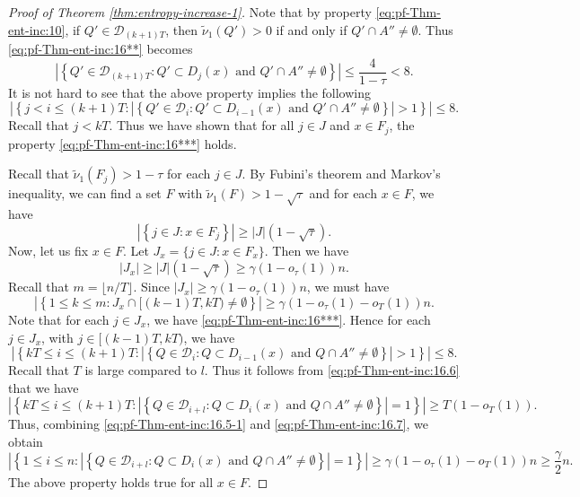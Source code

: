 \documentclass[a4paper,11pt]{amsart}
\theoremstyle{definition}
\numberwithin{equation}{section}
\def\D{\mathcal{D}}
\begin{document}
\begin{proof}[Proof of Theorem \ref{thm:entropy-increase-1}]
{Note that by property \eqref{eq:pf-Thm-ent-inc:10}, if $Q'\in \D_{(k+1)T}$, then $\tilde{\nu}_1(Q')>0$ if and only if $Q'\cap A''\neq \emptyset.$ Thus \eqref{eq:pf-Thm-ent-inc:16**} becomes 
\begin{equation}\label{eq:pf-Thm-ent-inc:16**.1}
\left| \left\{ Q'\in \D_{(k+1)T}: Q'\subset  D_j(x) \textrm{  and  }  Q'\cap A''\neq \emptyset  \right\} \right| \le \frac{4}{1-\tau}<8.
\end{equation}
It is not hard to see that the above property implies the following 
\begin{equation}\label{eq:pf-Thm-ent-inc:16***}
\left|\left\{j< i\le (k+1)T: \left| \left\{ Q'\in \D_{i}: Q'\subset  D_{i-1}(x) \textrm{  and  }  Q'\cap A''\neq \emptyset  \right\} \right|>1\right\}\right| \le 8.
\end{equation}
Recall that $j<kT$.   Thus we have shown that for all $j\in J$ and $x\in F_j$, the property \eqref{eq:pf-Thm-ent-inc:16***} holds.

Recall that $\tilde{\nu}_1(F_j)>1-\tau$ for each $j\in J$.  By Fubini's theorem and Markov's inequality, we can find a set $F$ with   $\tilde{\nu}_1(F)>1-\sqrt{\tau}$ and for each $x\in F$, we have
\begin{equation}\label{eq:pf-Thm-ent-inc:16****}
\left|\left\{ j\in J: x\in F_j  \right\}\right| \ge |J|(1-\sqrt{\tau}).
\end{equation}
Now,  let us fix $x\in F$. Let $J_x=\{j\in J: x\in F_x\}$.
Then we have 
\[
|J_x| \ge |J|(1-\sqrt{\tau})\ge \gamma(1-o_\tau(1))n.
\]
Recall that $m=\lfloor n/T\rfloor$.  Since $|J_x|\ge \gamma(1-o_\tau(1))n$,  we must have 
\begin{equation}\label{eq:pf-Thm-ent-inc:16.5-1}
\left| \left\{ 1\le k\le m: J_x\cap[(k-1)T,kT )\neq \emptyset  \right\} \right| \ge  \gamma(1-o_\tau(1)-o_T(1))n.
\end{equation}
Note that for each $j\in J_x$, we have \eqref{eq:pf-Thm-ent-inc:16***}.  Hence for each $j\in J_x$,  with $j\in [(k-1)T,kT )$, we have 
\begin{equation}\label{eq:pf-Thm-ent-inc:16.6}
\left|\left\{kT\le i\le (k+1)T: \left| \left\{ Q\in \D_{i}: Q\subset  D_{i-1}(x) \textrm{  and  }  Q\cap A''\neq \emptyset  \right\} \right|>1\right\}\right| \le 8.
\end{equation}
Recall that $T$ is large compared to $l$. Thus it follows from \eqref{eq:pf-Thm-ent-inc:16.6} that we have 
\begin{equation}\label{eq:pf-Thm-ent-inc:16.7}
\left|\left\{kT\le i\le (k+1)T: \left| \left\{ Q\in \D_{i+l}: Q\subset  D_{i}(x) \textrm{  and  }  Q\cap A''\neq \emptyset  \right\} \right|=1\right\}\right| \ge T(1-o_T(1)).
\end{equation}
Thus, combining \eqref{eq:pf-Thm-ent-inc:16.5-1} and \eqref{eq:pf-Thm-ent-inc:16.7},  we obtain 
\begin{equation*}
\left|\left\{1\le i\le n: \left| \left\{ Q\in \D_{i+l}: Q\subset  D_{i}(x) \textrm{  and  }  Q\cap A''\neq \emptyset  \right\} \right|=1\right\}\right| \ge \gamma(1-o_\tau(1)-o_T(1))n \ge \frac{\gamma}{2}n.
\end{equation*}
The above property holds true for all $x\in F$.

}
\end{proof}
\end{document}
